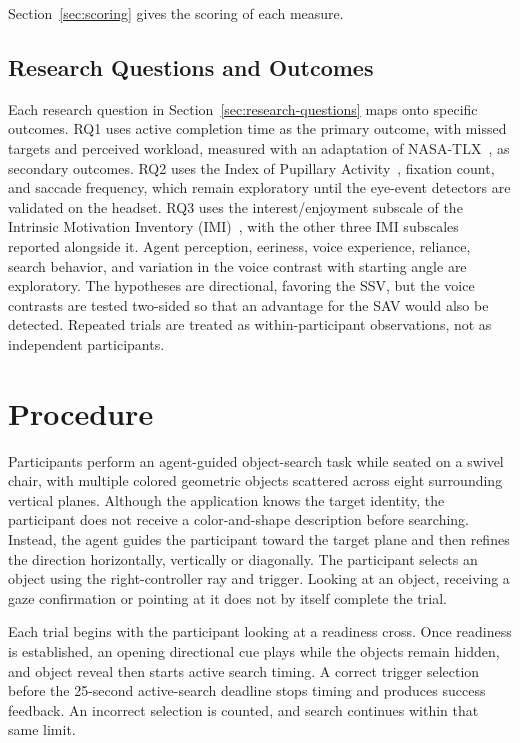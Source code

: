 Section~\ref{sec:scoring} gives the scoring of each measure.

\subsection{Research Questions and Outcomes}
Each research question in Section~\ref{sec:research-questions} maps onto specific outcomes. RQ1 uses active completion time as the primary outcome, with missed targets and perceived workload, measured with an adaptation of NASA-TLX~\cite{hart1988nasatlx}, as secondary outcomes. RQ2 uses the Index of Pupillary Activity~\cite{duchowski2018ipa}, fixation count, and saccade frequency, which remain exploratory until the eye-event detectors are validated on the headset. RQ3 uses the interest/enjoyment subscale of the Intrinsic Motivation Inventory (IMI)~\cite{ryan1982control,mcauley1989imi}, with the other three IMI subscales reported alongside it. Agent perception, eeriness, voice experience, reliance, search behavior, and variation in the voice contrast with starting angle are exploratory. The hypotheses are directional, favoring the SSV, but the voice contrasts are tested two-sided so that an advantage for the SAV would also be detected. Repeated trials are treated as within-participant observations, not as independent participants.


\section{Procedure}
Participants perform an agent-guided object-search task while seated on a swivel chair, with multiple colored geometric objects scattered across eight surrounding vertical planes. Although the application knows the target identity, the participant does not receive a color-and-shape description before searching. Instead, the agent guides the participant toward the target plane and then refines the direction horizontally, vertically or diagonally. The participant selects an object using the right-controller ray and trigger. Looking at an object, receiving a gaze confirmation or pointing at it does not by itself complete the trial.

Each trial begins with the participant looking at a readiness cross. Once readiness is established, an opening directional cue plays while the objects remain hidden, and object reveal then starts active search timing. A correct trigger selection before the 25-second active-search deadline stops timing and produces success feedback. An incorrect selection is counted, and search continues within that same limit.

